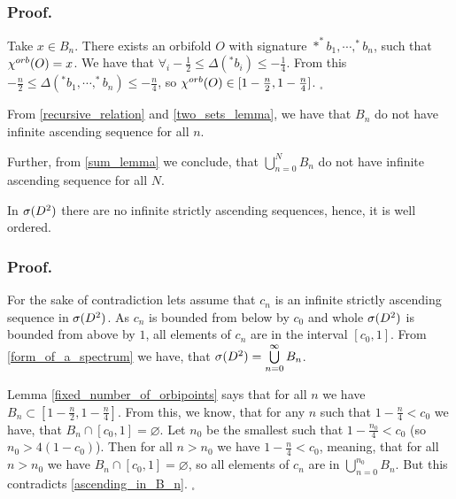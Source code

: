\subsubsection{Proof.}
Take $x \in B_n$. There exists an orbifold $O$ with signature $\ast ^*b_1, \cdots, ^*b_n$, 
such that ${\chi^{orb}(O)} = x$. We have that $\forall_i -\frac{1}{2} \leq \Delta(^*b_i) \leq 
-\frac{1}{4}$. From this $-\frac{n}{2} \leq \Delta(^*b_1, \cdots, ^*b_n) \leq -\frac{n}{4}$, 
so ${\chi^{orb}(O)} \in [1-\frac{n}{2}, 1-\frac{n}{4}]$. $_\square$

\begin{observation}\label{ascending_in_B_n}
From \ref{recursive_relation} and \ref{two_sets_lemma}, we have that $B_n$ do not have 
infinite ascending sequence for all $n$. 

Further, from \ref{sum_lemma} we conclude, 
that $\bigcup\limits_{n=0}^N B_n$ do not have infinite ascending sequence for all $N$.
\end{observation}

\begin{theorem}\label{well_order}
In ${{\sigma}(D^2)}$ there are no infinite strictly ascending sequences, hence, it is well ordered.
\end{theorem}
\subsubsection{Proof.}
For the sake of contradiction lets assume that $c_n$ is an infinite strictly ascending sequence in 
${{\sigma}(D^2)}$. As $c_n$ is bounded from below by $c_0$ and whole ${{\sigma}(D^2)}$ is bounded from above 
by $1$, all elements of $c_n$ are in the interval $[c_0, 1]$. 
From \ref{form_of_a_spectrum} we have, that ${{\sigma}(D^2)} = \bigcup\limits^\infty_{n=0}B_n$. 

Lemma 
\ref{fixed_number_of_orbipoints} says that for all $n$ we
have $B_n \subset [1-\frac{n}{2}, 1 - \frac{n}{4}]$. From this, we know, that for any 
$n$ such that $1 - \frac{n}{4} < c_0$ 
we have, that $B_n \cap [c_0,1] = \varnothing $. Let $n_0$ be the smallest such that 
$1 - \frac{n_0}{4} < c_0$ (so $n_0 > 4(1-c_0)$). 
Then for all $n > n_0$ we have $1 - \frac{n}{4} < c_0$, meaning, that 
for all $n > n_0$ we have
$B_n \cap [c_0,1] = \varnothing $, so all elements of $c_n$ are in 
$\bigcup\limits_{n=0}^{n_0} B_n$.
But this contradicts \ref{ascending_in_B_n}.  $_\square$









